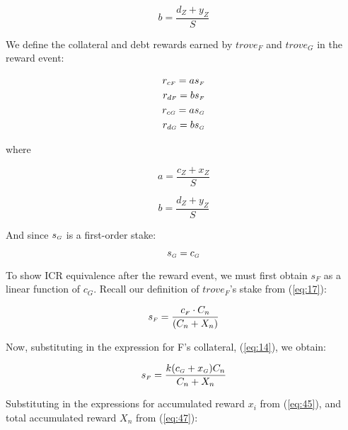 \documentclass[reqno]{article}
\begin{document}
\begin{equation} 
    b=\frac{d_Z+y_Z}{S}
\end{equation}

\bigskip
We define the collateral and debt rewards earned by $trove_F$ and $trove_G$ in the reward event:

\begin{equation} \label{eq:20}
    \begin{split}
        r_{c\mathsmaller{F}}=as_\mathsmaller{F}\\
        r_{d\mathsmaller{F}}=bs_\mathsmaller{F}\\
        r_{c\mathsmaller{G}}=as_\mathsmaller{G}\\
        r_{d\mathsmaller{G}}=bs_\mathsmaller{G}
    \end{split}
\end{equation}

\bigskip
where

\begin{equation} 
    a=\frac{c_Z+x_Z}{S}
\end{equation}

\begin{equation} 
    b=\frac{d_Z+y_Z}{S}
\end{equation}

\bigskip
And since $s_\mathsmaller{G}$ is a first-order stake:

\begin{equation} \label{eq:21}
    s_\mathsmaller{G}=c_\mathsmaller{G}
\end{equation}

\bigskip
To show ICR equivalence after the reward event, we must first obtain $s_F$ as a linear function of $c_G$. Recall our definition of $trove_F$’s stake from (\ref{eq:17}):

\begin{equation} 
    s_\mathsmaller{F}=\frac{c_\mathsmaller{F} \cdot C_n}{(C_n+X_n)}
\end{equation}

\bigskip
Now, substituting in the expression for F’s collateral, (\ref{eq:14}), we obtain:

\begin{equation} 
    s_\mathsmaller{F}=\frac{k(c_\mathsmaller{G}+x_\mathsmaller{G})C_n}{C_n+X_n}
\end{equation}


\bigskip
Substituting in the expressions for accumulated reward $x_i$ from (\ref{eq:45}), and total accumulated reward $X_n$ from (\ref{eq:47}):
\end{document}
